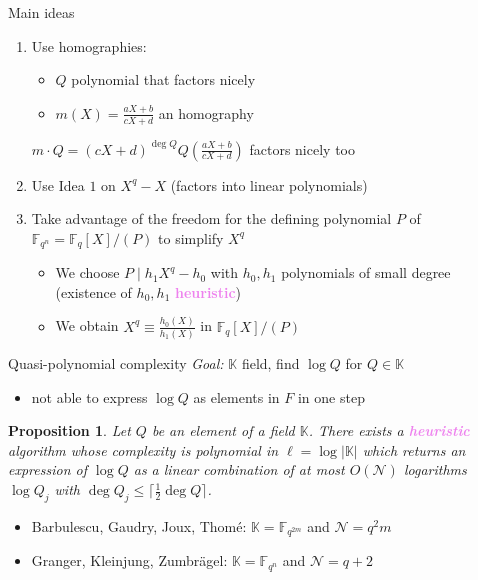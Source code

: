 \documentclass[xcolor=x11names,compress]{beamer}
\theoremstyle{break}
\newtheorem{prop}[thm]{Proposition}
\theoremstyle{sc}
\theoremstyle{definition}
\theoremstyle{remark}
\begin{document}
\begin{frame}{Main ideas}
  \begin{enumerate}
    \item Use homographies:
      \begin{itemize}
        \item $Q$ polynomial that factors nicely
        \item $m(X) = \frac{aX+b}{cX+d}$ an homography
      \end{itemize}
      $m\cdot Q = (cX+d)^{\deg Q}Q(\frac{aX+b}{cX+d})$ factors nicely too
      \newline
    \item Use Idea $1$ on $X^q-X$ (factors into linear polynomials)
      \newline
    \item Take advantage of the freedom for the defining polynomial $P$ of
      $\mathbb{F}_{q^n}=\mathbb{F}_q[X]/(P)$ to simplify $X^q$
      \begin{itemize}
        \item We choose $P\;|\;h_1X^q-h_0$ with $h_0, h_1$ polynomials of small
          degree (existence of $h_0, h_1$
          \textcolor{violet}{\textbf{heuristic}})
        \item We obtain $X^q \equiv \frac{h_0(X)}{h_1(X)}$ in
          $\mathbb{F}_q[X]/(P)$
      \end{itemize}
  \end{enumerate}
\end{frame}

\begin{frame}{Quasi-polynomial complexity}
  \emph{Goal:} $\mathbb{K}$ field, find $\log Q$ for $Q\in \mathbb{K}$ 
  \begin{itemize}
    \item not able to express $\log Q$ as elements in $F$ in one step 
  \end{itemize}
\begin{prop}
  Let $Q$ be an element of a field $\mathbb{K}$. There exists a
  \textcolor{violet}{\textbf{heuristic}} algorithm whose complexity is polynomial in
  $\ell=\log|\mathbb{K}|$ which returns an expression of $\log Q$ as a linear combination of
  at most $O(\mathcal N)$ logarithms $\log Q_j$ with $\deg Q_j\leq \lceil
  \frac{1}{2}\deg Q\rceil$.
\end{prop}
\begin{itemize}
  \item Barbulescu, Gaudry, Joux, Thomé: $\mathbb{K}=\mathbb{F}_{q^{2m}}$ and $\mathcal N=q^2 m$
  \item Granger, Kleinjung, Zumbrägel: $\mathbb{K}=\mathbb{F}_{q^n}$ and $\mathcal N =
    q+2$
\end{itemize}
\end{frame}
\end{document}
